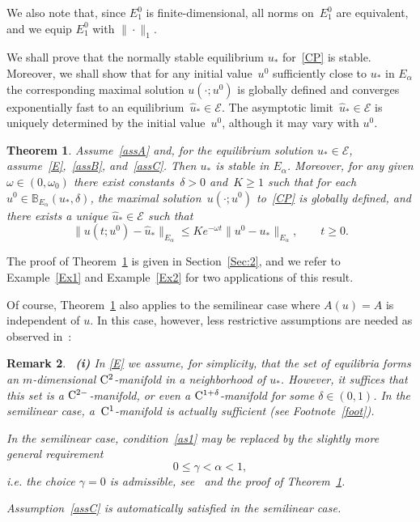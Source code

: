 \documentclass[reqno,11pt]{amsart}
\numberwithin{equation}{section}
\newtheorem{thm}{Theorem}[section]
\newtheorem{rem}[thm]{Remark}
\theoremstyle{remark}
\begin{document}
 We also note that,  since $E_1^0$ is  finite-dimensional, all norms on~$E_1^0$ are equivalent, 
and we equip $E_1^0$ with $\|\cdot\|_1$. \medskip
 
We shall prove that the normally stable equilibrium $u_*$  for~\eqref{CP} is stable.
  Moreover, we shall show that for any initial value~$u^0$ sufficiently close to $u_*$ in $E_\alpha$
   the corresponding maximal solution $u(\cdot;u^0)$ is globally defined and converges exponentially fast to an  equilibrium~$\hat{u}_* \in \mathcal{E}$. 
The asymptotic limit~$\hat{u}_* \in \mathcal{E}$ is uniquely determined by the initial value~$u^0$, although it may vary with $u^0$.
 
\begin{thm}\label{MT1}
Assume~\eqref{assA} and, for the equilibrium solution $u_*\in\mathcal{E}$, assume~\eqref{E},~\eqref{assB}, and~\eqref{assC}. Then $u_*$ is stable in $E_\alpha$. Moreover, for any given $\omega\in(0,\omega_0)$ there exist constants~$\delta>0$ and~${K\geq 1}$ such that for each  $u^0\in \mathbb{B}_{E_\alpha}(u_*,\delta)$, the maximal solution~$u(\cdot;u^0)$ to~\eqref{CP} is globally defined, and there exists a unique $\hat u_*\in \mathcal{E}$ such that
\begin{equation}\label{des:expstab}
\|u(t;u^0)-\hat u_*\|_{E_\alpha}\leq K e^{-\omega t}\|u^0-u_*\|_{E_\alpha},\qquad t\geq 0.
\end{equation}
\end{thm}

The proof of Theorem~\ref{MT1} is given in Section~\ref{Sec:2}, and we refer to Example~\ref{Ex1} and Example~\ref{Ex2} for two applications of this result.\medskip

 Of course, Theorem~\ref{MT1} also applies to the semilinear case where $A(u)=A$ is independent of $u$. In this case, however, less restrictive assumptions are needed as observed in~\cite{CDM25}:


\begin{rem}\label{R:aMT1}\,
{\bf (i)} In \eqref{E} we assume, for simplicity, that the set of equilibria forms an $m$-dimensional ${\rm C}^{2}$-manifold in a neighborhood of $u_*$. 
However, it suffices  that this set is a ${\rm C}^{2-}$-manifold, or even a ${\rm C}^{1+\delta}$-manifold for some $\delta \in (0,1)$. 
 In the semilinear case, a~${\rm C}^{1}$-manifold is actually sufficient (see Footnote~\ref{foot}).\smallskip


 In the semilinear case, condition~\eqref{as1} may be replaced by the slightly more general requirement 
\[
0 \le \gamma < \alpha < 1,
\]
i.e. the choice $\gamma = 0$ is admissible, see~\cite[Theorem~1.2]{MW_PRSE} and the proof of Theorem~\ref{MT1}. 
\smallskip

 Assumption~\eqref{assC} is automatically satisfied in the semilinear case. 

\end{rem}
\end{document}
